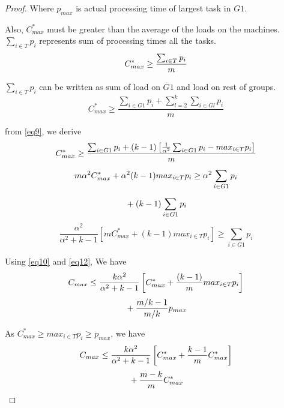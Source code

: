 \documentclass[10pt, conference, compsocconf]{IEEEtran}
\begin{document}
\begin{proof}
Where $p_{max}$ is actual processing time of largest task in $G1$. 

Also, $C_{max}^{*}$ must be greater than the average of the  loads on   the machines. $\sum_{i \in T }{{p_{i}}}$ represents sum of processing times all the tasks.
\begin{equation}{\nonumber}
C_{max}^{*} \geq  \frac{\sum_{i \in T }^{}{{p_{i}}}}{m}
\end{equation}

$\sum_{i \in T }{{p_{i}}}$ can be written as sum of load on $G1$ and load on rest of groups.
\begin{equation}\label{eq11}
 C_{max}^{*} \geq  \frac{\sum_{i \in G1 }^{}{{p_{i}}}+ \sum_{l=2}^{k}\sum_{i \in Gl }^{}{{p_{i}}}}{m}
\end{equation}

from \ref{eq9}, we derive
\begin{equation}{\nonumber}
 C_{max}^{*} \geq  \frac{\sum_{i \in G1 }^{}{{p_{i}}}+ (k-1)\left[\frac{1}{\alpha^{2}}\sum_{i \in G1 }^{}{{p_{i}}}-  {max_{i \in T}}{{p_{i}}}\right]}{m}
\end{equation}
\begin{equation}{\nonumber}
 m\alpha^{2}C_{max}^{*} + \alpha^{2} (k-1){max_{i \in T}}{{p_{i}}} \geq  \alpha^{2}\sum_{i \in G1 }^{}{{p_{i}}}  
\end{equation}
\begin{equation}{\nonumber}
 + (k-1)\sum_{i \in G1 }^{}{{p_{i}}} 
\end{equation}
\begin{equation}\label{eq12}
\frac{\alpha^{2}}{\alpha^{2}+k-1}\left[m C_{max}^{*}+(k-1) {max_{i \in T}}{{p_{i}}}\right] \geq \sum_{i \in G1 }^{}{{p_{i}}}  
\end{equation}

Using \ref{eq10} and \ref{eq12}, We have
\begin{equation}{\nonumber}
C_{max} \leq \frac{k\alpha^{2}}{\alpha^{2}+k-1}\left[ C_{max}^{*}+\frac{(k-1)}{m} {max_{i \in T}}{{p_{i}}}\right]
\end{equation}
\begin{equation}{\nonumber}
 + {\frac{m/k-1}{m/k}} p_{max} 
\end{equation}

 As $C_{max}^{*}\geq {{max_{i \in T}}{p_{i}}}\geq p_{max}$, we have
\begin{equation}{\nonumber}
 C_{max} \leq \frac{k\alpha^{2}}{\alpha^{2}+k-1}\left[ C_{max}^{*}+ {\frac{k-1}{m}}{C_{max}^{*}}\right] 
  \end{equation}
 \begin{equation}{\nonumber}
   + {\frac{m-k}{m}} C_{max}^{*} 
   \end{equation}    
 

\end{proof}
\end{document}
